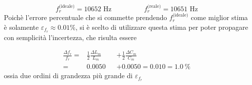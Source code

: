 \documentclass[12pt,italian]{article}
\begin{document}
\begin{equation*}
	f_{r}^{\text{(ideale)}} = 10652 \text{ Hz} \hspace{2cm} f_{r}^{\text{(reale)}} = 10651 \text{ Hz}
\end{equation*}
Poichè l'errore percentuale che si commette prendendo $f_{r}^{\text{(ideale)}}$
come miglior stima è solamente $\varepsilon_{f_r} \approx 0.01\%$, si è scelto
di utilizzare questa stima per poter propagare con semplicità l'incertezza, che
risulta essere

\begin{equation*}
	\begin{alignedat}{2}
		\frac{\Delta f_{r}}{f_{r}} = & \frac{1}{2} \frac{\Delta L_{m}}{L_{m}} &  & + \frac{1}{2} \frac{\Delta C_{m}}{C_{m}} \\
		=                            & 0.0050                                 &  & + 0.0050
		= 0.010 = 1.0 \ \%
	\end{alignedat}
\end{equation*}
ossia due ordini di grandezza più grande di $\varepsilon_{f_r}$
\end{document}
